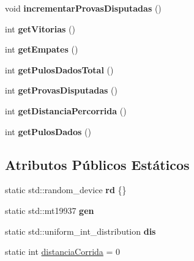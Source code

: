 \begin{DoxyCompactItemize}
\item 
void {\bfseries incrementar\+Provas\+Disputadas} ()\hypertarget{classSapo_a6eabbccc8722c4547d70714d37ad921d}{}\label{classSapo_a6eabbccc8722c4547d70714d37ad921d}

\item 
int {\bfseries get\+Vitorias} ()\hypertarget{classSapo_a102f82c22691765c15873d4ea667156e}{}\label{classSapo_a102f82c22691765c15873d4ea667156e}

\item 
int {\bfseries get\+Empates} ()\hypertarget{classSapo_a24a527ff7ab06d1bde72a76fef41a17c}{}\label{classSapo_a24a527ff7ab06d1bde72a76fef41a17c}

\item 
int {\bfseries get\+Pulos\+Dados\+Total} ()\hypertarget{classSapo_aa8c32cb5b1fbb1516b0a374f63b016a0}{}\label{classSapo_aa8c32cb5b1fbb1516b0a374f63b016a0}

\item 
int {\bfseries get\+Provas\+Disputadas} ()\hypertarget{classSapo_a696fde1a1c0a5dde7f424cb2637d2895}{}\label{classSapo_a696fde1a1c0a5dde7f424cb2637d2895}

\item 
int {\bfseries get\+Distancia\+Percorrida} ()\hypertarget{classSapo_a41a99439aacf25a65c60622eb7e65f60}{}\label{classSapo_a41a99439aacf25a65c60622eb7e65f60}

\item 
int {\bfseries get\+Pulos\+Dados} ()\hypertarget{classSapo_a9b0fa3af63f26b61e822f71afe853e6c}{}\label{classSapo_a9b0fa3af63f26b61e822f71afe853e6c}

\end{DoxyCompactItemize}
\subsection*{Atributos Públicos Estáticos}
\begin{DoxyCompactItemize}
\item 
static std\+::random\+\_\+device {\bfseries rd} \{\}\hypertarget{classSapo_a382c452c69ddad80c4f5b410f1d5687f}{}\label{classSapo_a382c452c69ddad80c4f5b410f1d5687f}

\item 
static std\+::mt19937 {\bfseries gen}\hypertarget{classSapo_ad6855a4e0c711e1a46be2c2609ab0398}{}\label{classSapo_ad6855a4e0c711e1a46be2c2609ab0398}

\item 
static std\+::uniform\+\_\+int\+\_\+distribution {\bfseries dis}\hypertarget{classSapo_a56c768e990e4a2f6ebac183dbc45ce77}{}\label{classSapo_a56c768e990e4a2f6ebac183dbc45ce77}

\item 
static int \hyperlink{classSapo_a27db8e8195d914b42d78114c02fe3fc2}{distancia\+Corrida} = 0
\end{DoxyCompactItemize}
